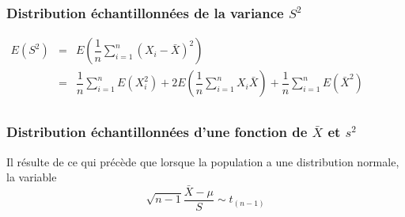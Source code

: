 \subsubsection{Distribution échantillonnées de la variance $S^2$}
\begin{center}
	$\begin{array}{LCL}
		E(S^2) &=& E\left(\dfrac{1}{n}\sum_{i=1}^n \left(X_i - \bar{X}\right)^2\right)\\
               &=& \dfrac{1}{n}\sum_{i=1}^n  E\left(X_i^2\right) + 2E\left(\dfrac{1}{n}\sum_{i=1}^n X_i\bar{X}\right)+ \dfrac{1}{n}\sum_{i=1}^n  E\left(\bar{X}^2\right)\\
	\end{array}$
\end{center}









\newpage
\subsubsection{Distribution échantillonnées d'une fonction de $\bar{X}$ et $s^2$}
Il résulte de ce qui précède que lorsque la population a une distribution normale, la variable
$$\boxed{\sqrt{n-1}\dfrac{\bar{X}-\mu}{S} \sim t_{(n-1)}}$$
